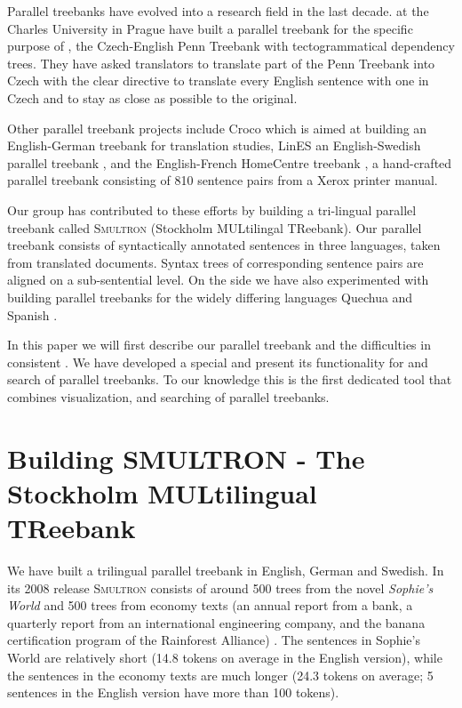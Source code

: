 \documentclass[output=paper]{LSP/langsci}
\begin{document}
Parallel treebanks have evolved into a research field in the last decade. \citet{CmejrekEtAl2003} at the Charles University in Prague have built a parallel treebank for the specific purpose of , the Czech-English Penn Treebank with tectogrammatical dependency trees. They have asked translators to translate part of the Penn Treebank into Czech with the clear directive to translate every English sentence with one in Czech and to stay as close as possible to the original. 

Other parallel treebank projects include Croco \citep{Hansen-SchirraEtAl2006} which is aimed at building an English-German treebank for translation studies, LinES an English-Swedish parallel treebank \citep{Ahrenberg2007}, and the English-French HomeCentre treebank \citep{Hearne2006}, a hand-crafted parallel treebank consisting of 810 sentence pairs from a Xerox printer manual. 

Our group has contributed to these efforts by building a tri-lingual parallel treebank called S\textsc{multron} (Stockholm MULtilingal TReebank). Our parallel treebank consists of syntactically annotated sentences in three languages, taken from translated documents. Syntax trees of corresponding sentence pairs are aligned on a sub-sentential level. On the side we have also experimented with building parallel treebanks for the widely differing languages Quechua and Spanish \citep{RiosEtAl2009}. 

In this paper we will first describe our parallel treebank and the difficulties in consistent . We have developed a special  and present its functionality for  and search of parallel treebanks. To our knowledge this is the first dedicated tool that combines visualization,  and searching of parallel treebanks. 

\section{Building SMULTRON - The Stockholm MULtilingual TReebank}\label{sec:volk:2}

We have built a trilingual parallel treebank in English, German and Swedish. In its 2008 release S\textsc{multron} consists of around 500 trees from the novel \textit{Sophie's World} and 500 trees from economy texts (an annual report from a bank, a quarterly report from an international engineering company, and the banana certification program of the Rainforest Alliance) \citep{Samuelsson2006, Samuelsson2007}. The sentences in Sophie's World are relatively short (14.8 tokens on average in the English version), while the sentences in the economy texts are much longer (24.3 tokens on average; 5 sentences in the English version have more than 100 tokens). 
\end{document}
